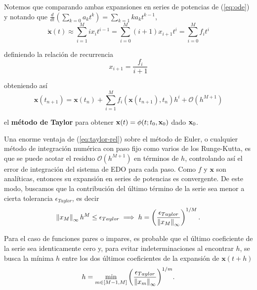 Notemos que comparando ambas expansiones en series de potencias de (\ref{eq:ode}) y notando que $ \frac{d}{dt} \left( \sum_{k=0} a_k t^k \right) = \sum_{k=1} k a_k t^{k-1}$,   
\begin{equation*}
 \dot{\mathbf{x}}(t) \approx \sum_{i=1}^M i x_i t^{i-1} = \sum_{i=0}^M (i+1)x_{i+1} t^i = \sum_{i=0}^M f_i t^i
\end{equation*}

definiendo la relación de recurrencia
\begin{equation}
x_{i+1} = \frac{f_i}{i+1}
\label{eq:rec-rel}
\end{equation}

obteniendo así 
\begin{equation}
\mathbf{x}(t_{n+1}) = \mathbf{x}(t_n) + \sum_{i=1}^M f_i(\mathbf{x}(t_{n+1}),t_n)h^i + \mathcal{O}(h^{M+1})
\label{eq:taylor-rel}
\end{equation}

el \textbf{método de Taylor} para obtener $\mathbf{x}(t) = \phi(t;t_0,\mathbf{x}_0)$ dado $\mathbf{x}_0$.

Una enorme ventaja de (\ref{eq:taylor-rel}) sobre el método de Euler, o cualquier método de integración numérica con paso fijo como varios de los Runge-Kutta, es que se puede acotar el residuo $\mathcal{O}(h^{M+1})$ en términos de $h$, controlando así el error de integración del sistema de EDO para cada paso. Como $f$ y $\mathbf{x}$ son analíticas, entonces su expansión en series de potencias es convergente. De este modo, buscamos que la contribución del último término de la serie sea menor a cierta tolerancia $\epsilon_{Taylor}$, es decir
\begin{equation*}
\left\lVert x_M\right\rVert_\infty h^M \leq \epsilon_{Taylor} \implies h = \left( \frac{\epsilon_{Taylor}}{\left\lVert x_M\right\rVert_\infty} \right)^{1/M}.
\end{equation*} 

Para el caso de funciones pares o impares, es probable que el último coeficiente de la serie sea identicamente cero y, para evitar indeterminaciones al encontrar $h$, se busca la mínima $h$ entre los dos últimos coeficientes de la expansión de $\mathbf{x}(t+h)$
\begin{equation}
h = \min_{m \in [M-1,M]}{ \left( \frac{\epsilon_{Taylor}}{\left\lVert x_m\right\rVert_\infty} \right)^{1/m} }.
\label{eq:stepsize}
\end{equation} 

